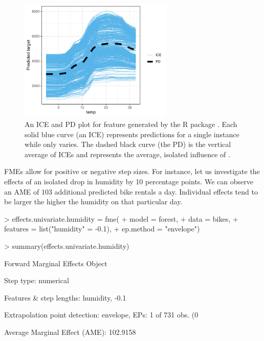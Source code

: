 \begin{figure}[H]
    \centering
    \includegraphics[width = 0.65\textwidth]{figures/iceplot.pdf}
    \caption{An ICE and PD plot for feature  generated by the R package . Each solid blue curve (an ICE) represents predictions for a single instance while only  varies. The dashed black curve (the PD) is the vertical average of ICEs and represents the average, isolated influence of .}
    \label{fig:iceplot}
\end{figure}
\par
FMEs allow for positive or negative step sizes. For instance, let us investigate the effects of an isolated drop in humidity by 10 percentage points. We can observe an AME of 103 additional predicted bike rentals a day. Individual effects tend to be larger the higher the humidity on that particular day.
\begin{example}    
> effects.univariate.humidity = fme(
+   model = forest,
+   data = bikes,
+   features = list("humidity" = -0.1),
+   ep.method = "envelope")

> summary(effects.univariate.humidity)
\end{example}

\begin{example}
Forward Marginal Effects Object

Step type:
  numerical

Features & step lengths:
  humidity, -0.1

Extrapolation point detection:
  envelope, EPs: 1 of 731 obs. (0 %

Average Marginal Effect (AME):
  102.9158
\end{example}


